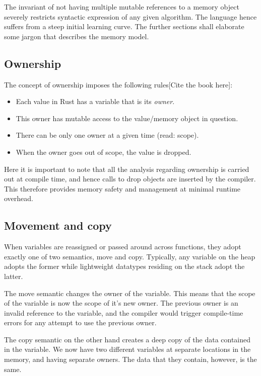 The invariant of not having multiple mutable references to a memory object severely restricts syntactic expression of any given algorithm. The language hence suffers from a steep initial learning curve. The further sections shall elaborate some jargon that describes the memory model.

\subsection{Ownership}
The concept of ownership imposes the following rules[Cite the book here]:
\begin{itemize}
\item Each value in Rust has a variable that is its \emph{owner}.
\item This owner has mutable access to the value/memory object in question.
\item There can be only one owner at a given time (read: scope).
\item When the owner goes out of scope, the value is dropped.
\end{itemize}
Here it is important to note that all the analysis regarding ownership is carried out at compile time, and hence calls to drop objects are inserted by the compiler. This therefore provides memory safety and management at minimal runtime overhead.

\subsection{Movement and copy}
When variables are reassigned or passed around across functions, they adopt exactly one of two semantics, move and copy. Typically, any variable on the heap adopts the former while lightweight datatypes residing on the stack adopt the latter.

The move semantic changes the owner of the variable. This means that the scope of the variable is now the scope of it's new owner. The previous owner is an invalid reference to the variable, and the compiler would trigger compile-time errors for any attempt to use the previous owner.

The copy semantic on the other hand creates a deep copy of the data contained in the variable. We now have two different variables at separate locations in the memory, and having separate owners. The data that they contain, however, is the same.


